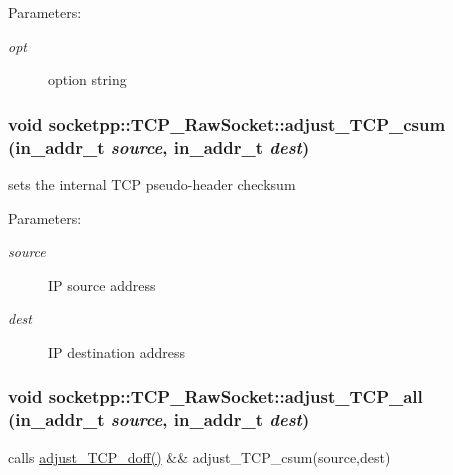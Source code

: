\begin{Desc}
\item[Parameters:]
\begin{description}
\item[{\em opt}]option string \end{description}
\end{Desc}
\hypertarget{classsocketpp_1_1TCP__RawSocket_c1a2ef8b2661bb0f3ca3fa6a636b25fd}{
\subsubsection{\setlength{\rightskip}{0pt plus 5cm}void socketpp::TCP\_\-RawSocket::adjust\_\-TCP\_\-csum (in\_\-addr\_\-t {\em source}, \/  in\_\-addr\_\-t {\em dest})}}
\label{classsocketpp_1_1TCP__RawSocket_c1a2ef8b2661bb0f3ca3fa6a636b25fd}


sets the internal TCP pseudo-header checksum 

\begin{Desc}
\item[Parameters:]
\begin{description}
\item[{\em source}]IP source address \item[{\em dest}]IP destination address \end{description}
\end{Desc}
\hypertarget{classsocketpp_1_1TCP__RawSocket_0a1017145ae76253dfca51cbd672fae7}{
\subsubsection{\setlength{\rightskip}{0pt plus 5cm}void socketpp::TCP\_\-RawSocket::adjust\_\-TCP\_\-all (in\_\-addr\_\-t {\em source}, \/  in\_\-addr\_\-t {\em dest})}}
\label{classsocketpp_1_1TCP__RawSocket_0a1017145ae76253dfca51cbd672fae7}


calls \hyperlink{classsocketpp_1_1TCP__RawSocket_029eb8bfbf19531253edf046775d9f5f}{adjust\_\-TCP\_\-doff()} \&\& adjust\_\-TCP\_\-csum(source,dest) 

